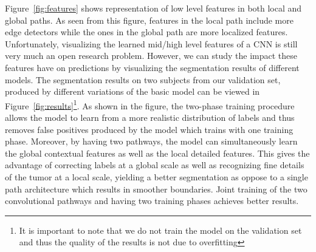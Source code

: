 \documentclass[final,5p,times,twocolumn]{elsarticle}
\begin{document}
{Figure~\ref{fig:features} shows representation of low level features in both local and global paths. As seen from this figure,  features in the local path include more edge detectors while the ones in the global path are more localized features. Unfortunately, visualizing the learned mid/high level features of a CNN is still very much an open research problem. However, we can study the impact these features have on predictions by visualizing the segmentation results of different models.
The segmentation results on two subjects from our validation set, produced by different variations of the basic model can be viewed in Figure~\ref{fig:results}\footnote{It is important to note that we do not train the model on the validation set and thus the quality of the results is not due to overfitting}. As shown in the figure, the two-phase training procedure allows the model to learn from a more realistic distribution of labels and thus removes false positives produced by the model which trains with one training phase.  Moreover, by having two pathways, the model can simultaneously learn the global contextual features as well as the local detailed features. This gives the advantage of correcting labels at a global scale as well as recognizing fine details of the tumor at a local scale, yielding a better segmentation as oppose to a single path architecture which results in smoother boundaries. %
Joint training of the two convolutional pathways and having two training phases achieves better results.





}
\end{document}
